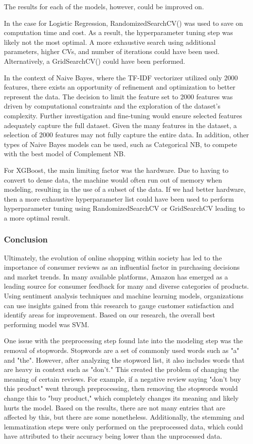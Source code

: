 \documentclass[stu,12pt,floatsintext]{apa7}
\begin{document}
The results for each of the models, however, could be improved on. 

In the case for Logistic Regression, RandomizedSearchCV() was used to save on computation time and cost. As a result, the hyperparameter tuning step was likely not the most optimal. A more exhaustive search using additional parameters, higher CVs, and number of iterations could have been used. Alternatively, a GridSearchCV() could have been performed. 

In the context of Naive Bayes, where the TF-IDF vectorizer utilized only 2000 features, there exists an opportunity of refinement and optimization to better represent the data. The decision to limit the feature set to 2000 features was driven by computational constraints and the exploration of the dataset's complexity. Further investigation and fine-tuning would ensure selected features adequately capture the full dataset. Given the many features in the dataset, a selection of 2000 features may not fully capture the entire data. In addition, other types of Naive Bayes models can be used, such as Categorical NB, to compete with the best model of Complement NB.

For XGBoost, the main limiting factor was the hardware. Due to having to convert to dense data, the machine would often run out of memory when modeling, resulting in the use of a subset of the data. If we had better hardware, then a more exhaustive hyperparameter list could have been used to perform hyperparameter tuning using RandomizedSearchCV or GridSearchCV leading to a more optimal result.

\subsubsection{Conclusion}

Ultimately, the evolution of online shopping within society has led to the importance of consumer reviews as an influential factor in purchasing decisions and market trends. In many available platforms, Amazon has emerged as a leading source for consumer feedback for many and diverse categories of products. Using sentiment analysis techniques and machine learning models, organizations can use insights gained from this research to gauge customer satisfaction and identify areas for improvement. Based on our research, the overall best performing model was SVM.

One issue with the preprocessing step found late into the modeling step was the removal of stopwords. Stopwords are a set of commonly used words such as "a" and "the". However, after analyzing the stopword list, it also includes words that are heavy in context such as "don't." This created the problem of changing the meaning of certain reviews. For example, if a negative review saying "don't buy this product" went through preprocessing, then removing the stopwords would change this to "buy product," which completely changes its meaning and likely hurts the model. Based on the results, there are not many entries that are affected by this, but there are some nonetheless. Additionally, the stemming and lemmatization steps were only performed on the preprocessed data, which could have attributed to their accuracy being lower than the unprocessed data.
\end{document}
